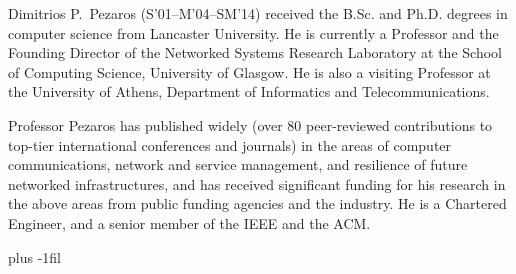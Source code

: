 \documentclass[10pt, times, comsoc]{IEEEtran}
\begin{document}
\begin{IEEEbiography}
	{Dimitrios P.\ Pezaros}
	(S’01–M’04–SM’14) received the B.Sc. and Ph.D. degrees in computer science from Lancaster University. He is currently a Professor and the Founding Director of the Networked Systems Research Laboratory at the School of Computing Science, University of Glasgow. He is also a visiting Professor at the University of Athens, Department of Informatics and Telecommunications.
	
	Professor Pezaros has published widely (over 80 peer-reviewed contributions to top-tier international conferences and journals) in the areas of computer communications, network and service management, and resilience of future networked infrastructures, and has received significant funding for his research in the above areas from public funding agencies and the industry. He is a Chartered Engineer, and a senior member of the IEEE and the ACM.
	
\end{IEEEbiography}
\vskip 0pt plus -1fil
\end{document}
